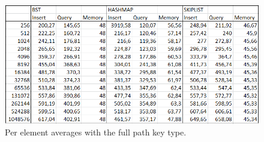 \documentclass[12pt,a4paper]{article}
\begin{document}
    \begin{figure}[h!]
    \centering
    \includegraphics[width=\textwidth]{full-path-averages.png}
    \caption{Per element averages with the full path key type.}
    \end{figure}
\end{document}
